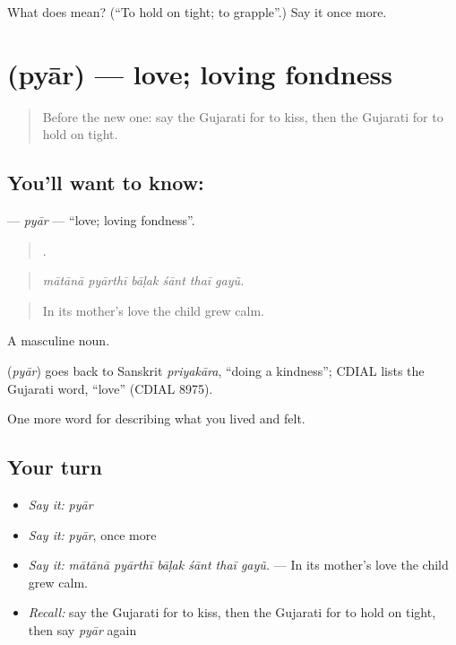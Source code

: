 \begin{tcolorbox}[breakable,colback=teal!4,colframe=teal!35!black,title={Before you move on}]
What does  mean? (\textquotedblleft{}To hold on tight; to grapple\textquotedblright{}.) Say it once more.
\end{tcolorbox}
\section[\texorpdfstring{\gu{પ્યાર} (pyār)}{પ્યાર (pyār)}]{ (pyār) — love; loving fondness}

\label{lesson:GU-C451-pyar}



\begin{quote}
Before the new one: say the Gujarati for to kiss, then the Gujarati for to hold on tight.
\end{quote}

\subsection*{You'll want to know: }
\textbf{} — \emph{pyār} — \textquotedblleft{}love; loving fondness\textquotedblright{}.

\begin{quote}
     .
\end{quote}

\begin{quote}
\emph{mātānā pyārthī bāḷak śānt thaī gayũ.}
\end{quote}

\begin{quote}
In its mother's love the child grew calm.
\end{quote}

A masculine noun.

\begin{cousinweb}
\textbf{} (\emph{pyār}) goes back to Sanskrit \emph{priyakāra}, \textquotedblleft{}doing a kindness\textquotedblright{}; CDIAL lists the Gujarati word, \textquotedblleft{}love\textquotedblright{} (CDIAL 8975).
\end{cousinweb}

\begin{grammarlens}[title={What you've built}]
One more word for describing what you lived and felt.
\end{grammarlens}

\subsection*{Your turn}
\begin{itemize}
\raggedright
  \item \emph{Say it:} \emph{pyār}
  \item \emph{Say it:} \emph{pyār}, once more
  \item \emph{Say it:} \emph{mātānā pyārthī bāḷak śānt thaī gayũ.} — In its mother's love the child grew calm.
  \item \emph{Recall:} say the Gujarati for to kiss, then the Gujarati for to hold on tight, then say \emph{pyār} again
\end{itemize}

